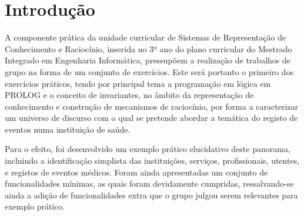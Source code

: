 \documentclass[
  oneside,
  10pt, a4paper,
  footinclude=true,
  headinclude=true,
  cleardoublepage=empty
]{scrbook}
\author{Filipe C. Oliveira, Filipe S. Marques, Luís F. Mendes}
\date{\myear} %
\begin{document}
	\umfrontcover	
	\umtitlepage
	
	
	\cleardoublepage
	
	
	\tableofcontents
	
	
	
	\chapter{Introdução}
		A componente prática da unidade curricular de Sistemas de Representação de Conhecimento e Raciocínio, inserida no 3º ano do plano curricular do Mestrado  Integrado em Engenharia Informática, pressupõem a realização de trabalhos de grupo na forma de um conjunto de exercícios. Este será portanto o primeiro dos exercícios práticos, tendo por principal tema a programação em lógica em PROLOG e o conceito de invariantes, no âmbito da representação de conhecimento e construção de mecanismos de raciocínio, por forma a caracterizar um universo de discurso com o qual se pretende abordar a temática do registo de eventos numa instituição de saúde. \par 
Para o efeito, foi desenvolvido um exemplo prático elucidativo deste panorama, incluindo a identificação simplista das instituições, serviços, profissionais, utentes, e registos de eventos médicos. Foram ainda apresentadas um conjunto de funcionalidades mínimas, as quais foram devidamente cumpridas, ressalvando-se ainda a adição de funcionalidades extra que o grupo julgou serem relevantes para exemplo prático.

\end{document}
